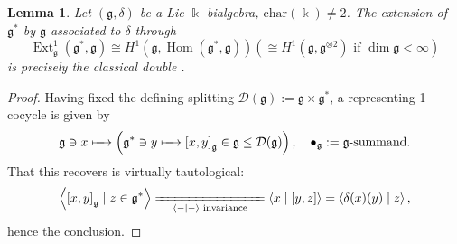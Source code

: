 \documentclass[11pt,leqno]{article}
\theoremstyle{plain}
\newtheorem{lemma}{Lemma}[section]
\theoremstyle{plain}
\theoremstyle{plain}
\numberwithin{equation}{section}
\theoremstyle{nonumberplain}
\newtheorem{proof}{Proof}
\newcommand\cD{{\mathcal D}}
\newcommand\fg{{\mathfrak g}}
\newcommand\1{{\bf 1}}
\DeclareMathOperator{\Hom}{\mathrm{Hom}}
\DeclareMathOperator{\Ext}{\mathrm{Ext}}
\begin{document}
\begin{lemma}\label{le:bialg.as.1cocyc}
  Let $\left(\fg,\delta\right)$ be a Lie $\Bbbk$-bialgebra, $\mathrm{char}(\Bbbk)\ne 2$. The extension of $\fg^*$ by $\fg$ associated to $\delta$ through
  \begin{equation*}
    \Ext^1_{\fg}(\fg^*,\fg)
    \cong
    H^1(\fg,\Hom(\fg^*,\fg))
    \left(      
      \cong
      H^1\left(\fg,\fg^{\otimes 2}\right)
      \text{ if }
      \dim\fg<\infty
    \right)
  \end{equation*}
  is precisely the classical double .
\end{lemma}
\begin{proof}
 
  
  Having fixed the defining splitting $\cD(\fg):=\fg\times \fg^*$, a representing 1-cocycle is given by
  \begin{equation*}
    \fg\ni
    x\xmapsto{\quad}
    \left(
      \fg^*\ni y
      \xmapsto{\quad}
      \left[x,y\right]_{\fg}
      \in \fg\le \cD(\fg)
    \right),\quad
    \bullet_{\fg}:=\text{$\fg$-summand}. 
  \end{equation*}
  That this recovers  is virtually tautological:
  \begin{equation*}
    \Braket{\left[x,y\right]_{\fg}\mid z\in \fg^*}
    \xlongequal[\quad\Braket{-\mid-}\text{ invariance}\quad]{\quad}
    \Braket{x\mid [y,z]}
    =
    \Braket{\delta(x)(y)\mid z},
  \end{equation*}
  hence the conclusion.
\end{proof}
\end{document}
